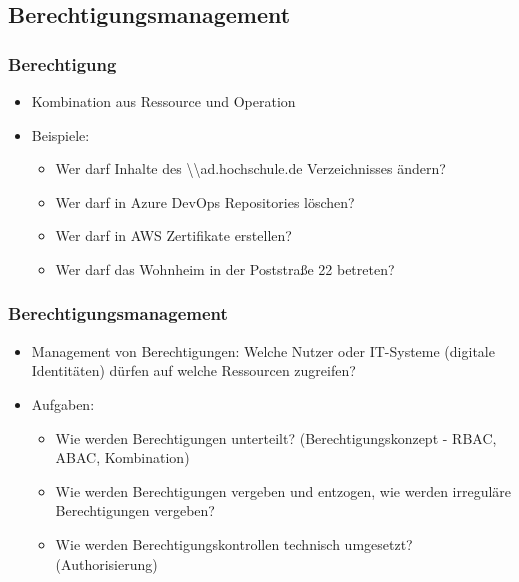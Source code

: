 \documentclass[11pt]{beamer}
\begin{document}
\subsection{Berechtigungsmanagement}
\begin{frame}
  \frametitle{Berechtigung}
  \begin{itemize}
    \item Kombination aus Ressource und Operation~
    \item Beispiele:
          \begin{itemize}
            \item Wer darf Inhalte des \textbackslash{}\textbackslash{}ad.hochschule.de Verzeichnisses ändern?
            \item Wer darf in Azure DevOps Repositories löschen?
            \item Wer darf in AWS Zertifikate erstellen?
            \item Wer darf das Wohnheim in der Poststraße 22 betreten?
          \end{itemize}
  \end{itemize}
\end{frame}

\begin{frame}
  \frametitle{Berechtigungsmanagement}
  \begin{itemize}
    \item Management von Berechtigungen: Welche Nutzer oder IT-Systeme (digitale Identitäten) dürfen auf welche Ressourcen zugreifen?
    \item Aufgaben:
          \begin{itemize}
            \item Wie werden Berechtigungen unterteilt? (Berechtigungskonzept - RBAC, ABAC, Kombination)
            \item Wie werden Berechtigungen vergeben und entzogen, wie werden irreguläre Berechtigungen vergeben?
            \item Wie werden Berechtigungskontrollen technisch umgesetzt? (Authorisierung)
          \end{itemize}
  \end{itemize}
\end{frame}
\end{document}
